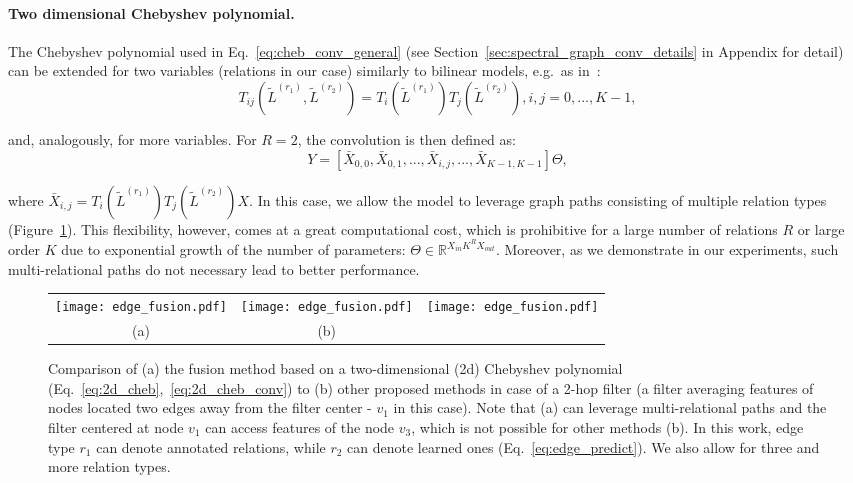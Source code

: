 \documentclass[final,nonatbib]{article} \usepackage{nips_2018}
\begin{document}
	\paragraph{Two dimensional Chebyshev polynomial.}
	The Chebyshev polynomial used in Eq.~\ref{eq:cheb_conv_general} (see Section~\ref{sec:spectral_graph_conv_details} in Appendix for detail) can be extended for two variables (relations in our case) similarly to bilinear models, e.g.~as in~\cite{omar2010two}:
\begin{equation}
	\label{eq:2d_cheb}
	T_{ij}(\tilde{L}^{(r_1)},\tilde{L}^{(r_2)}) = T_i(\tilde{L}^{(r_1)})T_j(\tilde{L}^{(r_2)}), i,j = 0,...,K-1,
	\end{equation}

	and, analogously, for more variables. For $R=2$, the convolution is then defined as:
\begin{equation}
	\label{eq:2d_cheb_conv}
Y = [\bar{X}_{0,0}, \bar{X}_{0,1},...,\bar{X}_{i,j},..., \bar{X}_{K-1,K-1}] \Theta,
	\end{equation}

	where $\bar{X}_{i,j} = T_i(\tilde{L}^{(r_1)})T_j(\tilde{L}^{(r_2)}) X $.
	In this case, we allow the model to leverage graph paths consisting of multiple relation types (Figure~\ref{fig:edge_fusion}).
	This flexibility, however, comes at a great computational cost, which is prohibitive for a large number of relations $R$ or large order $K$ due to exponential growth of the number of parameters: $\Theta \in \mathbb{R}^{X_{in}K^R X_{out}}$. Moreover, as we demonstrate in our experiments, such multi-relational paths do not necessary lead to better performance.

	\begin{figure}[]
		\begin{center}
			\begin{tabular}{ccc}
{\texttt{[image: edge\_fusion.pdf]}} &
				{\texttt{[image: edge\_fusion.pdf]}} &
				{\texttt{[image: edge\_fusion.pdf]}} \\
				(a) & (b) &
			\end{tabular}
		\end{center}
		\caption{Comparison of (a) the fusion method based on a two-dimensional (2d) Chebyshev polynomial (Eq.~\ref{eq:2d_cheb},~\ref{eq:2d_cheb_conv}) to (b) other proposed methods in case of a 2-hop filter (a filter averaging features of nodes located two edges away from the filter center - $v_1$ in this case). Note that (a) can leverage multi-relational paths and the filter centered at node $v_1$ can access features of the node $v_3$, which is not possible for other methods (b). In this work, edge type $r_1$ can denote annotated relations, while $r_2$ can denote learned ones (Eq.~\ref{eq:edge_predict}). We also allow for three and more relation types.}
		\label{fig:edge_fusion}
	\end{figure}
\end{document}
